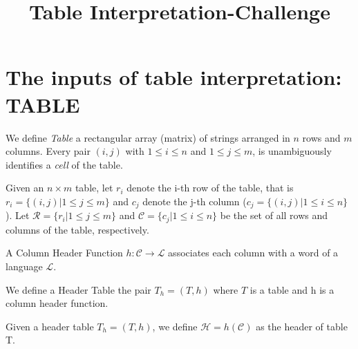 \documentclass{llncs}
\begin{document}
\title{Table Interpretation-Challenge}

\author{}

\maketitle


\section{The inputs of table interpretation: TABLE}
\begin{definition}[Table]
      We define \textit{Table} a rectangular array (matrix) of strings arranged in $n$ rows and $m$ columns. Every pair $(i,j)$ with $1\leq i \leq n$ and $1\leq j \leq m$, is unambiguously identifies a \textit{cell} of the table.
\end{definition}

\begin{definition}
      Given an $n\times m$ table, let $r_i$ denote the i-th row of the table, that is $r_i =\{(i,j) | 1\leq j \leq m\}$ and  $c_j$ denote the j-th column ($c_j =\{(i,j) |1\leq i \leq n\}$).
      Let $\mathcal{R} = \{r_i | 1\leq j \leq m\}$ and $\mathcal{C} = \{c_j|1\leq i \leq n\}$ be the set of all rows and columns of the table, respectively.
\end{definition}

\begin{definition}
      A Column Header Function $h: \mathcal{C}\to \mathcal{L}$ associates each column with a word of a language $\mathcal{L}$.
\end{definition}

\begin{definition}
      We define a Header Table the pair $T_h =(T, h)$ where  $T$ is a table and h is a column header function.
\end{definition}

\begin{definition}[Header]
      Given a header table $T_h =(T, h)$, we define $\mathcal{H}=h(\mathcal{C})$ as the header of table T.
\end{definition}
\end{document}
